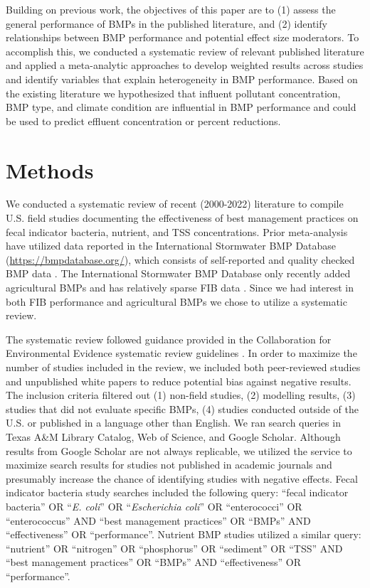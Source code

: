 \documentclass[utf8]{FrontiersinHarvard}
\begin{document}
Building on previous work, the objectives of this paper are to (1) assess the general performance of BMPs in the published literature, and (2) identify relationships between BMP performance and potential effect size moderators.
To accomplish this, we conducted a systematic review of relevant published literature and applied a meta-analytic approaches to develop weighted results across studies and identify variables that explain heterogeneity in BMP performance.
Based on the existing literature we hypothesized that influent pollutant concentration, BMP type, and climate condition are influential in BMP performance and could be used to predict effluent concentration or percent reductions.

\hypertarget{methods}{%
\section{Methods}\label{methods}}

We conducted a systematic review of recent (2000-2022) literature to compile U.S. field studies documenting the effectiveness of best management practices on fecal indicator bacteria, nutrient, and TSS concentrations.
Prior meta-analysis have utilized data reported in the International Stormwater BMP Database (\url{https://bmpdatabase.org/}), which consists of self-reported and quality checked BMP data \citep{claryBMPPerformanceAnalysis2011, kochNitrogenRemovalStormwater2014, horvathEffectsRegionalClimate2023}.
The International Stormwater BMP Database only recently added agricultural BMPs and has relatively sparse FIB data \citep{claryBMPPerformanceAnalysis2011, kochNitrogenRemovalStormwater2014}.
Since we had interest in both FIB performance and agricultural BMPs we chose to utilize a systematic review.

The systematic review followed guidance provided in the Collaboration for Environmental Evidence systematic review guidelines \citep{collaborationforenvironmentalevidenceGuidelinesStandardsEvidence2018}.
In order to maximize the number of studies included in the review, we included both peer-reviewed studies and unpublished white papers to reduce potential bias against negative results.
The inclusion criteria filtered out (1) non-field studies, (2) modelling results, (3) studies that did not evaluate specific BMPs, (4) studies conducted outside of the U.S. or published in a language other than English.
We ran search queries in Texas A\&M Library Catalog, Web of Science, and Google Scholar.
Although results from Google Scholar are not always replicable, we utilized the service to maximize search results for studies not published in academic journals and presumably increase the chance of identifying studies with negative effects.
Fecal indicator bacteria study searches included the following query: ``fecal indicator bacteria'' OR ``\emph{E. coli}'' OR ``\emph{Escherichia coli}'' OR ``enterococci'' OR ``enterococcus'' AND ``best management practices'' OR ``BMPs'' AND ``effectiveness'' OR ``performance''. Nutrient BMP studies utilized a similar query: ``nutrient'' OR ``nitrogen'' OR ``phosphorus'' OR ``sediment'' OR ``TSS'' AND ``best management practices'' OR ``BMPs'' AND ``effectiveness'' OR ``performance''.
\end{document}
